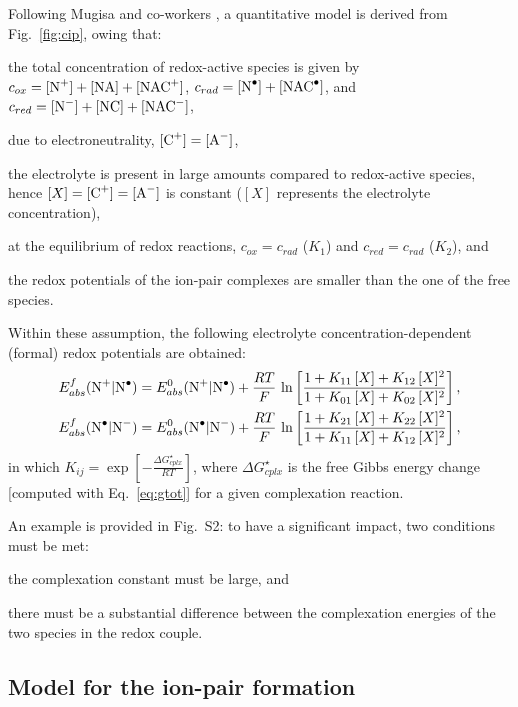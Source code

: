 \documentclass[review,preprint]{elsarticle}
\begin{document}
Following Mugisa and co-workers \cite{mugisaEffectIonparingKinetics2024}, a quantitative model is derived from Fig.~\ref{fig:cip}, owing that: \begin{inparaenum}[(i)]
	\item the total concentration of redox-active species is given by $c_{ox} = [\ce{N+}] + [\ce{NA}] + [\ce{NAC+}]$, $c_{rad} = [\ce{N^.}] + [\ce{NAC^.}]$, and $c_{red} =  [\ce{N-}] + [\ce{NC}] + [\ce{NAC-}]$,
	\item due to electroneutrality, $ [\ce{C+}] = [\ce{A-}] $,
	\item the electrolyte is present in large amounts compared to redox-active species, hence $[X] = [\ce{C+}] = [\ce{A-}] $ is constant ($[X]$ represents the electrolyte concentration),
	\item at the equilibrium of redox reactions, $c_{ox} = c_{rad}$ ($K_1$) and $c_{red} = c_{rad}$ ($K_2$), and
	\item the redox potentials of the ion-pair complexes are smaller than the one of the free species.
\end{inparaenum}
Within these assumption, the following electrolyte concentration-dependent (formal) redox potentials are obtained:\begin{align}
	E^f_{abs}(\ce{N+|N^.}) &= E^0_ {abs}(\ce{N+|N^.})+\frac{RT}{F}\,\ln\left[\frac{1+K_{11}\,[X]+K_{12}\,[X]^2}{1+K_{01}\,[X]+K_{02}\,[X]^2}\right],\label{eq:ef1}\\
	E^f_{abs}(\ce{N^.|N-}) &= E^0_ {abs}(\ce{N^.|N-})+\frac{RT}{F}\,\ln\left[\frac{1+K_{21}\,[X]+K_{22}\,[X]^2}{1+K_{11}\,[X]+K_{12}\,[X]^2}\right],\label{eq:ef2}
\end{align}
in which $K_{ij}= \exp\left[-\frac{\Delta G_{cplx}^\star}{RT}\right]$, where $\Delta G_{cplx}^\star$ is the free Gibbs energy change [computed with Eq.~\eqref{eq:gtot}] for a given complexation reaction.

An example is provided in Fig.~S2: to have a significant impact, two conditions must be met: \begin{inparaenum}[(i)]
	\item the complexation constant must be large, and
	\item there must be a substantial difference between the complexation energies of the two species in the redox couple.
\end{inparaenum}

\subsection{Model for the ion-pair formation}
\end{document}
